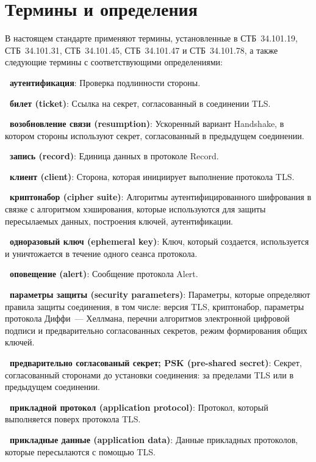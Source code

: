 \chapter{Термины и определения}\label{TERMS}

В настоящем стандарте применяют термины, установленные в СТБ~34.101.19, 
СТБ~34.101.31, СТБ~34.101.45, СТБ~34.101.47 и СТБ~34.101.78, а также следующие 
термины с соответствующими определениями: 

{\bf \thedefctr~аутентификация}:
Проверка подлинности стороны.

{\bf \thedefctr~билет (ticket)}:
Ссылка на секрет, согласованный в соединении TLS.

{\bf \thedefctr~возобновление связи (resumption)}: 
Ускоренный вариант Handshake, в котором стороны используют секрет, 
согласованный в предыдущем соединении. 

{\bf \thedefctr~запись (record)}:
Единица данных в протоколе Record.

{\bf \thedefctr~клиент (client)}:
Сторона, которая инициирует выполнение протокола TLS.


{\bf \thedefctr~криптонабор (cipher suite)}:
Алгоритмы аутентифицированного шифрования в связке с алгоритмом хэширования,
которые используются для защиты пересылаемых данных, построения ключей, 
аутентификации.

{\bf \thedefctr~одноразовый ключ (ephemeral key)}:
Ключ, который создается, используется и уничтожается в течение одного сеанса 
протокола. 


{\bf \thedefctr~оповещение (alert)}:
Сообщение протокола Alert.

{\bf \thedefctr~параметры защиты (security parameters)}:
Параметры, которые определяют правила защиты соединения, в том числе: 
версия TLS, криптонабор, параметры протокола Диффи~--- Хеллмана, перечни 
алгоритмов электронной цифровой подписи и предварительно согласованных 
секретов, режим формирования общих ключей.

{\bf \thedefctr~предварительно согласованый секрет; PSK (pre-shared secret)}:
Секрет, согласованный сторонами до установки соединения: за пределами TLS или в 
предыдущем соединении.

{\bf \thedefctr~прикладной протокол (application protocol)}:
Протокол, который выполняется поверх протокола TLS.

{\bf \thedefctr~прикладные данные (application data)}:
Данные прикладных протоколов, которые пересылаются с помощью TLS.

